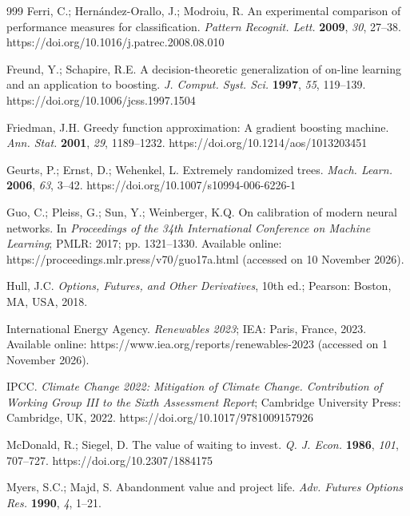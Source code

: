 \documentclass[agriengineering,article,submit,pdftex,moreauthors]{Definitions/mdpi}
\begin{document}
\begin{thebibliography}{999}
Ferri, C.; Hern\'andez-Orallo, J.; Modroiu, R. An experimental comparison of performance measures for classification. \emph{Pattern Recognit. Lett.} \textbf{2009}, \emph{30}, 27--38. https://doi.org/10.1016/j.patrec.2008.08.010

Freund, Y.; Schapire, R.E. A decision-theoretic generalization of on-line learning and an application to boosting. \emph{J. Comput. Syst. Sci.} \textbf{1997}, \emph{55}, 119--139. https://doi.org/10.1006/jcss.1997.1504

Friedman, J.H. Greedy function approximation: A gradient boosting machine. \emph{Ann. Stat.} \textbf{2001}, \emph{29}, 1189--1232. https://doi.org/10.1214/aos/1013203451

Geurts, P.; Ernst, D.; Wehenkel, L. Extremely randomized trees. \emph{Mach. Learn.} \textbf{2006}, \emph{63}, 3--42. https://doi.org/10.1007/s10994-006-6226-1

Guo, C.; Pleiss, G.; Sun, Y.; Weinberger, K.Q. On calibration of modern neural networks. In \emph{Proceedings of the 34th International Conference on Machine Learning}; PMLR: 2017; pp. 1321--1330. Available online: https://proceedings.mlr.press/v70/guo17a.html (accessed on 10 November 2026).

Hull, J.C. \emph{Options, Futures, and Other Derivatives}, 10th ed.; Pearson: Boston, MA, USA, 2018.

International Energy Agency. \emph{Renewables 2023}; IEA: Paris, France, 2023. Available online: https://www.iea.org/reports/renewables-2023 (accessed on 1 November 2026).

IPCC. \emph{Climate Change 2022: Mitigation of Climate Change. Contribution of Working Group III to the Sixth Assessment Report}; Cambridge University Press: Cambridge, UK, 2022. https://doi.org/10.1017/9781009157926

McDonald, R.; Siegel, D. The value of waiting to invest. \emph{Q. J. Econ.} \textbf{1986}, \emph{101}, 707--727. https://doi.org/10.2307/1884175

Myers, S.C.; Majd, S. Abandonment value and project life. \emph{Adv. Futures Options Res.} \textbf{1990}, \emph{4}, 1--21.


\end{thebibliography}
\end{document}
